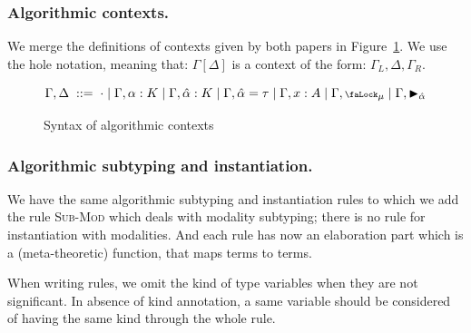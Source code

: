 \documentclass[a4paper,11pt]{article}
\begin{document}
\subsubsection{Algorithmic contexts.}
We merge the definitions of contexts given by both papers in
Figure~\ref{contexts}. We use the hole notation, meaning that: $\Gamma[\Delta]$
is a context of the form: $\Gamma_L,\Delta,\Gamma_R$.
\begin{figure}[h]
  \[
  \Gamma,\Delta\;::=\;\cdot\mid \Gamma,\alpha:K \mid \Gamma,\hat{\alpha}:K \mid
  \Gamma,\hat{\alpha}=\tau \mid \Gamma, x : A
  \mid \Gamma,\textsf{\scriptsize\faLock}_\mu
  \mid \Gamma, \blacktriangleright_{\hat{\alpha}}
  \]
  \caption{Syntax of algorithmic contexts}\label{contexts}
\end{figure}


\subsubsection{Algorithmic subtyping and instantiation.}
We have the same algorithmic subtyping and instantiation rules to which we add
the rule \textsc{Sub-Mod} which deals with modality subtyping; there is no rule
for instantiation with modalities. And each rule has now an elaboration part
which is a (meta-theoretic) function, that maps terms to terms.

When writing rules, we omit the kind of type variables when they are not
significant. In absence of kind annotation, a same variable should be considered
of having the same kind through the whole rule.
\end{document}
